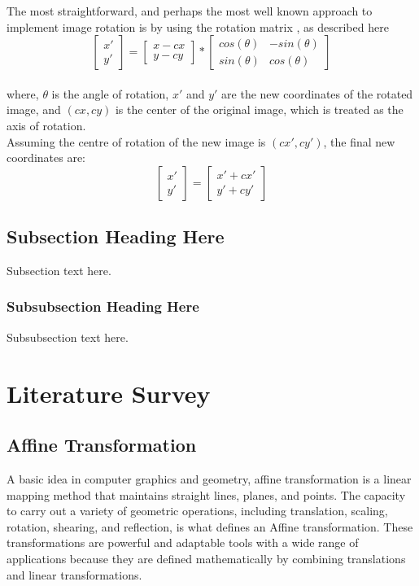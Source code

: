\documentclass[conference]{IEEEtran}
\begin{document}
The most straightforward, and perhaps the most well known approach to implement image rotation is by using the rotation matrix \cite{evans2001rotations}, as described here
$$\begin{bmatrix}
x'\\ 
y'
\end{bmatrix} = \begin{bmatrix}
x - cx\\ 
y - cy
\end{bmatrix} * \begin{bmatrix}
cos(\theta) & -sin(\theta)\\
sin(\theta) & cos(\theta)
\end{bmatrix}$$\\
where, $\theta$ is the angle of rotation, $x'$ and $y'$ are the new coordinates of the rotated image, and $(cx, cy)$ is the center of the original image, which is treated as the axis of rotation.\\
Assuming the centre of rotation of the new image is $(cx', cy')$, the final new coordinates are:
$$\begin{bmatrix}
x'\\ 
y'
\end{bmatrix} = \begin{bmatrix}
x' + cx'\\ 
y' + cy'
\end{bmatrix}$$

\subsection{Subsection Heading Here}
Subsection text here.


\subsubsection{Subsubsection Heading Here}
Subsubsection text here.


\section{Literature Survey}
\subsection{Affine Transformation}
A basic idea in computer graphics and geometry, affine transformation is a linear mapping method that maintains straight lines, planes, and points. The capacity to carry out a variety of geometric operations, including translation, scaling, rotation, shearing, and reflection, is what defines an Affine transformation. These transformations are powerful and adaptable tools with a wide range of applications because they are defined mathematically by combining translations and linear transformations.
\end{document}
